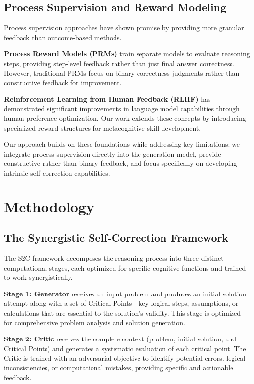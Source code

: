 \documentclass[10pt,twocolumn]{article}
\newcommand{\ssc}{\textsc{S2C}}
\begin{document}
\subsection{Process Supervision and Reward Modeling}

Process supervision approaches have shown promise by providing more granular feedback than outcome-based methods.

\textbf{Process Reward Models (PRMs)} train separate models to evaluate reasoning steps, providing step-level feedback rather than just final answer correctness. However, traditional PRMs focus on binary correctness judgments rather than constructive feedback for improvement.

\textbf{Reinforcement Learning from Human Feedback (RLHF)} has demonstrated significant improvements in language model capabilities through human preference optimization. Our work extends these concepts by introducing specialized reward structures for metacognitive skill development.

Our approach builds on these foundations while addressing key limitations: we integrate process supervision directly into the generation model, provide constructive rather than binary feedback, and focus specifically on developing intrinsic self-correction capabilities.

\section{Methodology}

\subsection{The Synergistic Self-Correction Framework}

The \ssc{} framework decomposes the reasoning process into three distinct computational stages, each optimized for specific cognitive functions and trained to work synergistically.

\textbf{Stage 1: Generator} receives an input problem and produces an initial solution attempt along with a set of Critical Points—key logical steps, assumptions, or calculations that are essential to the solution's validity. This stage is optimized for comprehensive problem analysis and solution generation.

\textbf{Stage 2: Critic} receives the complete context (problem, initial solution, and Critical Points) and generates a systematic evaluation of each critical point. The Critic is trained with an adversarial objective to identify potential errors, logical inconsistencies, or computational mistakes, providing specific and actionable feedback.
\end{document}
